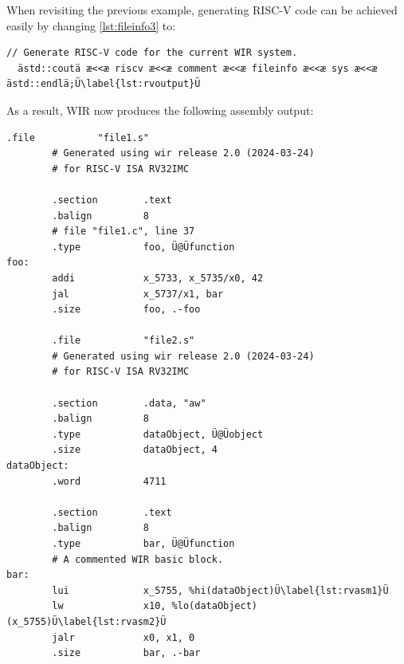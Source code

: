 When revisiting the previous example, generating RISC-V code can be achieved easily by changing \cref{lst:fileinfo3} to:

\begin{lstlisting}[style=code,float=h,firstnumber=58]
  // Generate RISC-V code for the current WIR system.
  ästd::coutä æ<<æ riscv æ<<æ comment æ<<æ fileinfo æ<<æ sys æ<<æ ästd::endlä;Ü\label{lst:rvoutput}Ü
\end{lstlisting}

As a result, \gls{WIR} now produces the following assembly output:

\begin{lstlisting}[style=commandline,float=!h]
        .file           "file1.s"
        # Generated using wir release 2.0 (2024-03-24)
        # for RISC-V ISA RV32IMC

        .section        .text
        .balign         8
        # file "file1.c", line 37
        .type           foo, Ü@Üfunction
foo:
        addi            x_5733, x_5735/x0, 42
        jal             x_5737/x1, bar
        .size           foo, .-foo

        .file           "file2.s"
        # Generated using wir release 2.0 (2024-03-24)
        # for RISC-V ISA RV32IMC

        .section        .data, "aw"
        .balign         8
        .type           dataObject, Ü@Üobject
        .size           dataObject, 4
dataObject:
        .word           4711

        .section        .text
        .balign         8
        .type           bar, Ü@Üfunction
        # A commented WIR basic block.
bar:
        lui             x_5755, %hi(dataObject)Ü\label{lst:rvasm1}Ü
        lw              x10, %lo(dataObject)(x_5755)Ü\label{lst:rvasm2}Ü
        jalr            x0, x1, 0
        .size           bar, .-bar
\end{lstlisting}

